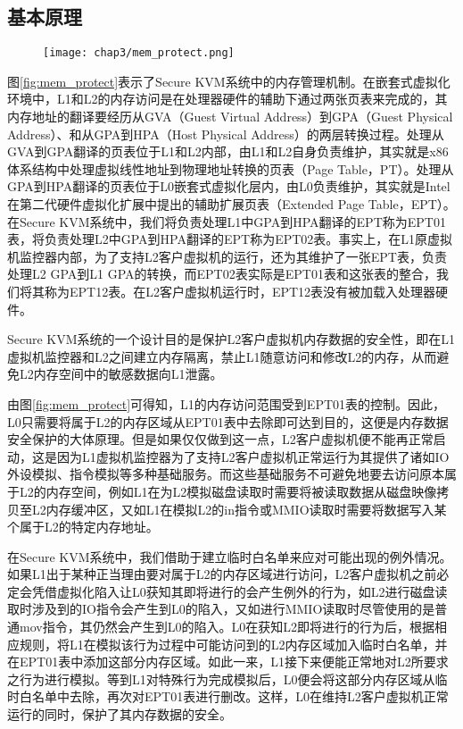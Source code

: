 \subsection{基本原理}

\begin{figure}[!htp]
  \centering
  \texttt{[image: chap3/mem\_protect.png]}
\end{figure}

图\ref{fig:mem_protect}表示了Secure KVM系统中的内存管理机制。在嵌套式虚拟化环境中，L1和L2的内存访问是在处理器硬件的辅助下通过两张页表来完成的，其内存地址的翻译要经历从GVA（Guest Virtual Address）到GPA（Guest Physical Address）、和从GPA到HPA（Host Physical Address）的两层转换过程。处理从GVA到GPA翻译的页表位于L1和L2内部，由L1和L2自身负责维护，其实就是x86体系结构中处理虚拟线性地址到物理地址转换的页表（Page Table，PT）。处理从GPA到HPA翻译的页表位于L0嵌套式虚拟化层内，由L0负责维护，其实就是Intel在第二代硬件虚拟化扩展中提出的辅助扩展页表（Extended Page Table，EPT）。在Secure KVM系统中，我们将负责处理L1中GPA到HPA翻译的EPT称为EPT01表，将负责处理L2中GPA到HPA翻译的EPT称为EPT02表。事实上，在L1原虚拟机监控器内部，为了支持L2客户虚拟机的运行，还为其维护了一张EPT表，负责处理L2 GPA到L1 GPA的转换，而EPT02表实际是EPT01表和这张表的整合，我们将其称为EPT12表。在L2客户虚拟机运行时，EPT12表没有被加载入处理器硬件。

Secure KVM系统的一个设计目的是保护L2客户虚拟机内存数据的安全性，即在L1虚拟机监控器和L2之间建立内存隔离，禁止L1随意访问和修改L2的内存，从而避免L2内存空间中的敏感数据向L1泄露。

由图\ref{fig:mem_protect}可得知，L1的内存访问范围受到EPT01表的控制。因此，L0只需要将属于L2的内存区域从EPT01表中去除即可达到目的，这便是内存数据安全保护的大体原理。但是如果仅仅做到这一点，L2客户虚拟机便不能再正常启动，这是因为L1虚拟机监控器为了支持L2客户虚拟机正常运行为其提供了诸如IO外设模拟、指令模拟等多种基础服务。而这些基础服务不可避免地要去访问原本属于L2的内存空间，例如L1在为L2模拟磁盘读取时需要将被读取数据从磁盘映像拷贝至L2内存缓冲区，又如L1在模拟L2的in指令或MMIO读取时需要将数据写入某个属于L2的特定内存地址。

在Secure KVM系统中，我们借助于建立临时白名单来应对可能出现的例外情况。如果L1出于某种正当理由要对属于L2的内存区域进行访问，L2客户虚拟机之前必定会凭借虚拟化陷入让L0获知其即将进行的会产生例外的行为，如L2进行磁盘读取时涉及到的IO指令会产生到L0的陷入，又如进行MMIO读取时尽管使用的是普通mov指令，其仍然会产生到L0的陷入。L0在获知L2即将进行的行为后，根据相应规则，将L1在模拟该行为过程中可能访问到的L2内存区域加入临时白名单，并在EPT01表中添加这部分内存区域。如此一来，L1接下来便能正常地对L2所要求之行为进行模拟。等到L1对特殊行为完成模拟后，L0便会将这部分内存区域从临时白名单中去除，再次对EPT01表进行删改。这样，L0在维持L2客户虚拟机正常运行的同时，保护了其内存数据的安全。

